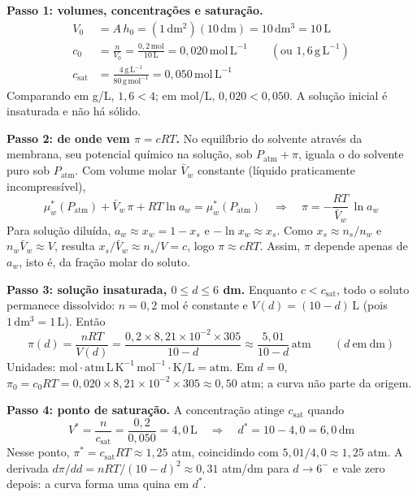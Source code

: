 \documentclass{article}%
\begin{document}
\textbf{Passo 1: volumes, concentrações e saturação.}
\begin{align*}
V_0 &= A\,h_0=(1\,\mathrm{dm^2})(10\,\mathrm{dm})=10\,\mathrm{dm^3}=10\,\mathrm{L}\\
c_0 &= \frac{n}{V_0}=\frac{0{,}2\,\mathrm{mol}}{10\,\mathrm{L}}=0{,}020\,\mathrm{mol\,L^{-1}}\qquad(\text{ou } 1{,}6\,\mathrm{g\,L^{-1}})\\
c_{\mathrm{sat}} &= \frac{4\,\mathrm{g\,L^{-1}}}{80\,\mathrm{g\,mol^{-1}}}=0{,}050\,\mathrm{mol\,L^{-1}}
\end{align*}
Comparando em g/L, $1{,}6<4$; em mol/L, $0{,}020<0{,}050$. A solução inicial é insaturada e não há sólido.

\textbf{Passo 2: de onde vem $\pi=cRT$.} No equilíbrio do solvente através da membrana, seu potencial químico na solução, sob $P_{\mathrm{atm}}+\pi$, iguala o do solvente puro sob $P_{\mathrm{atm}}$. Com volume molar $\bar V_w$ constante (líquido praticamente incompressível),
\[
\mu_w^{*}(P_{\mathrm{atm}})+\bar V_w\,\pi+RT\ln a_w=\mu_w^{*}(P_{\mathrm{atm}})
\quad\Rightarrow\quad
\pi=-\frac{RT}{\bar V_w}\,\ln a_w
\]
Para solução diluída, $a_w\approx x_w=1-x_s$ e $-\ln x_w\approx x_s$. Como $x_s\approx n_s/n_w$ e $n_w\bar V_w\approx V$, resulta $x_s/\bar V_w\approx n_s/V=c$, logo $\pi\approx cRT$. Assim, $\pi$ depende apenas de $a_w$, isto é, da fração molar do soluto.

\textbf{Passo 3: solução insaturada, $0\le d\le 6$ dm.} Enquanto $c<c_{\mathrm{sat}}$, todo o soluto permanece dissolvido: $n=0{,}2$ mol é constante e $V(d)=(10-d)\,\mathrm{L}$ (pois $1\,\mathrm{dm^3}=1\,\mathrm{L}$). Então
\[
\pi(d)=\frac{nRT}{V(d)}=\frac{0{,}2\times 8{,}21\times 10^{-2}\times 305}{10-d}\approx\frac{5{,}01}{10-d}\,\mathrm{atm}\qquad(d\ \mathrm{em\ dm})
\]
Unidades: $\mathrm{mol}\cdot\mathrm{atm\,L\,K^{-1}\,mol^{-1}}\cdot\mathrm{K}/\mathrm{L}=\mathrm{atm}$. Em $d=0$, $\pi_0=c_0RT=0{,}020\times 8{,}21\times 10^{-2}\times 305\approx 0{,}50$ atm; a curva não parte da origem.

\textbf{Passo 4: ponto de saturação.} A concentração atinge $c_{\mathrm{sat}}$ quando
\[
V^{*}=\frac{n}{c_{\mathrm{sat}}}=\frac{0{,}2}{0{,}050}=4{,}0\,\mathrm{L}\quad\Rightarrow\quad d^{*}=10-4{,}0=6{,}0\,\mathrm{dm}
\]
Nesse ponto, $\pi^{*}=c_{\mathrm{sat}}RT\approx 1{,}25$ atm, coincidindo com $5{,}01/4{,}0\approx 1{,}25$ atm. A derivada $d\pi/dd=nRT/(10-d)^2\approx 0{,}31$ atm/dm para $d\to 6^{-}$ e vale zero depois: a curva forma uma quina em $d^{*}$.
\end{document}
